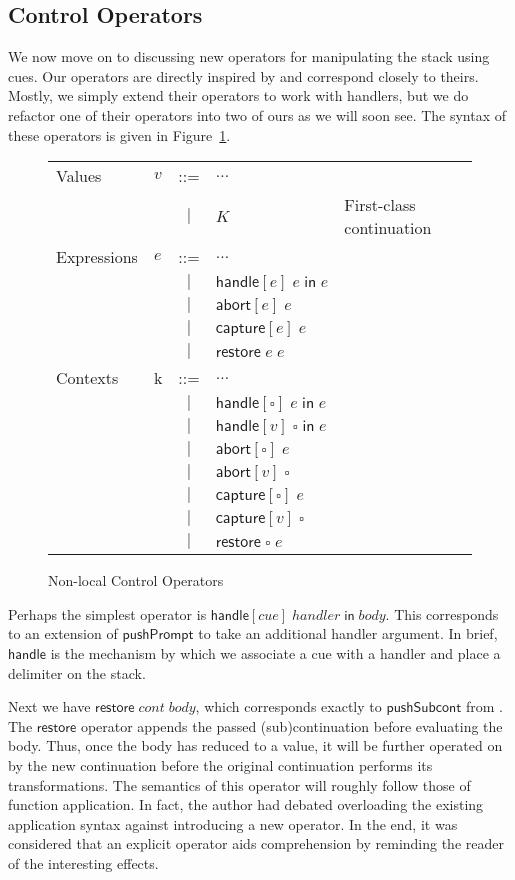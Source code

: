 \documentclass[11pt]{article}
\newcommand{\handle}[3]{\textsf{handle}[#1]\;#2\;\textsf{in}\;#3}
\newcommand{\abort}[2]{\textsf{abort}[#1]\;#2}
\newcommand{\capture}[2]{\textsf{capture}[#1]\;#2}
\newcommand{\pushSubcont}[2]{\textsf{restore}\;#1\;#2}
\begin{document}
\subsection{Control Operators}

We now move on to discussing new operators for manipulating the stack using cues.
Our operators are directly inspired by \cite{MFDC} and correspond closely to theirs.
Mostly, we simply extend their operators to work with handlers, but we do refactor one of their operators into two of ours as we will soon see.
The syntax of these operators is given in Figure~\ref{fig:addControl}.

\begin{figure}[h!]
\caption{Non-local Control Operators}
\label{fig:addControl}

\begin{tabular}{llcll}
Values & $v$ & ::= & $\ldots$ \\
& & $|$ & $K$ & First-class continuation \\
Expressions & $e$ & ::= & $\ldots$ \\
& & $|$ & $\handle{e}{e}{e}$ \\
& & $|$ & $\abort{e}{e}$ \\
& & $|$ & $\capture{e}{e}$ \\
& & $|$ & $\pushSubcont{e}{e}$ \\
Contexts & k & ::= & $\ldots$ \\
& & $|$ & $\handle{\square}{e}{e}$ \\
& & $|$ & $\handle{v}{\square}{e}$ \\
& & $|$ & $\abort{\square}{e}$ \\
& & $|$ & $\abort{v}{\square}$ \\
& & $|$ & $\capture{\square}{e}$ \\
& & $|$ & $\capture{v}{\square}$ \\
& & $|$ & $\pushSubcont{\square}{e}$ \\
\end{tabular}
\end{figure}

Perhaps the simplest operator is $\handle{cue}{handler}{body}$.
This corresponds to an extension of $\textsf{pushPrompt}$ to take an additional handler argument.
In brief, $\textsf{handle}$ is the mechanism by which we associate a cue with a handler and place a delimiter on the stack.

Next we have $\pushSubcont{cont}{body}$, which corresponds exactly to $\textsf{pushSubcont}$ from \cite{MFDC}.
The $\textsf{restore}$ operator appends the passed (sub)continuation before evaluating the body.
Thus, once the body has reduced to a value, it will be further operated on by the new continuation before the original continuation performs its transformations.
The semantics of this operator will roughly follow those of function application.
In fact, the author had debated overloading the existing application syntax against introducing a new operator.
In the end, it was considered that an explicit operator aids comprehension by reminding the reader of the interesting effects.
\end{document}
